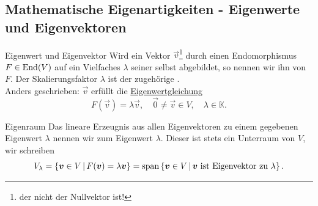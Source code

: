\subsection{Mathematische Eigenartigkeiten - Eigenwerte und Eigenvektoren}
\begin{Def}
{Eigenwert und Eigenvektor}
Wird ein Vektor $\Vec{v}$\footnote{der nicht der Nullvektor ist!} durch einen Endomorphismus $F\in\text{End}(V)$ auf ein Vielfaches $\lambda$ seiner selbst abgebildet, so nennen wir ihn  von $F$. Der Skalierungsfaktor $\lambda$ ist der zugehörige .\\
Anders geschrieben: $\Vec{v}$ erfüllt die \underline{Eigenwertgleichung}
\begin{equation}
\boxed{F(\Vec{v})=\lambda \Vec{v}}, \quad \Vec{0}\neq \Vec{v}\in V,\quad \lambda \in \mathbb{K}.
\end{equation}
\end{Def}

\begin{Def}
{Eigenraum}
Das lineare Erzeugnis aus allen Eigenvektoren zu einem gegebenen Eigenwert $\lambda$ nennen wir  zum Eigenwert $\lambda$. Dieser ist stets ein Unterraum von $V$, wir schreiben
\begin{equation}
V_\lambda=\left\{{\text{\boldmath${v}$}}\in V\,|\, F({\text{\boldmath${v}$}})=\lambda {\text{\boldmath${v}$}}\right\}=\text{span}\left\{{\text{\boldmath${v}$}}\in V\,|\,{\text{\boldmath${v}$}} \text{ ist Eigenvektor zu } \lambda\right\}.
\end{equation}
\end{Def}

